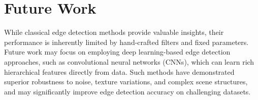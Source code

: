 \documentclass[12pt]{article}
\begin{document}
\section{Future Work}

While classical edge detection methods provide valuable insights, their performance is inherently limited by hand-crafted filters and fixed parameters. 
Future work may focus on employing deep learning-based edge detection approaches, such as convolutional neural networks (CNNs), which can learn rich hierarchical features directly from data. 
Such methods have demonstrated superior robustness to noise, texture variations, and complex scene structures, and may significantly improve edge detection accuracy on challenging datasets.
\end{document}
